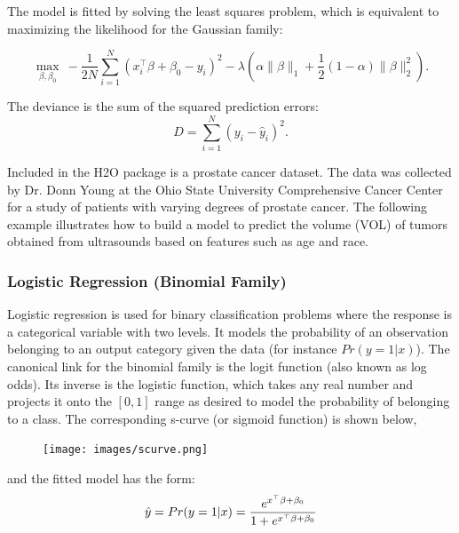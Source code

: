 The model is fitted by solving the least squares problem, which is equivalent to maximizing the likelihood for the Gaussian family:

$$ \max_{\beta,\beta_0} \ - \frac{1}{2N} \sum_{i=1}^N  (x_i^{\top}\beta + \beta_0 - y_i)^2  - \lambda \left(  \alpha \|\beta \|_1 +  \frac{1}{2} (1- \alpha) \| \beta \|_2^2 \right).$$

The deviance is the sum of the squared prediction errors: 
$$ D = \sum_{i=1}^{N} (y_i - \hat{y}_i)^2 . $$


Included in the H2O package is a prostate cancer dataset. The data was collected by Dr. Donn Young at the Ohio State
University Comprehensive Cancer Center for a study of patients with varying degrees of prostate cancer. The
following example illustrates how to build a model to predict the volume (VOL) of tumors obtained from ultrasounds
based on features such as age and race.

\waterExampleInR



\waterExampleInPython


\subsubsection{Logistic Regression (Binomial Family)}
Logistic regression is used for binary classification problems where the response is a categorical variable with two
levels. It models the probability of an observation belonging to an output category given the data (for instance $ Pr(y = 1|x)$).
The canonical link for the binomial family is the logit function (also known as log odds). Its inverse is the logistic function, which takes any real number and projects it onto the $[0,1]$ range as desired to model the probability of belonging to a class. The corresponding s-curve (or sigmoid function) is shown below,

\begin{figure}[h]
\centering
\texttt{[image: images/scurve.png]}
\end{figure}

and the fitted model has the form:
$$ \hat{y} = Pr(y = 1|x) = {e^{x^{\top}\beta + \beta_0} \over 1 + e^{x^{\top} \beta + \beta_0} }$$

